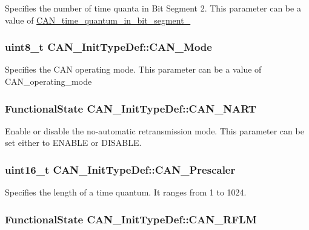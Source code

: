 \label{structCAN__InitTypeDef_a693eb00830d6e2aeb4d9fabdba85b9cf}
Specifies the number of time quanta in Bit Segment 2. This parameter can be a value of \hyperlink{group__CAN__time__quantum__in__bit__segment__2}{CAN\_\-time\_\-quantum\_\-in\_\-bit\_\-segment\_} \hypertarget{structCAN__InitTypeDef_a24816ff18ae048a5ec4bbb22aa2c04f9}{
\subsubsection[{CAN\_\-Mode}]{\setlength{\rightskip}{0pt plus 5cm}uint8\_\-t {\bf CAN\_\-InitTypeDef::CAN\_\-Mode}}}
\label{structCAN__InitTypeDef_a24816ff18ae048a5ec4bbb22aa2c04f9}
Specifies the CAN operating mode. This parameter can be a value of CAN\_\-operating\_\-mode \hypertarget{structCAN__InitTypeDef_a5adeac1b7b47f2b91e667eddc181ac09}{
\subsubsection[{CAN\_\-NART}]{\setlength{\rightskip}{0pt plus 5cm}FunctionalState {\bf CAN\_\-InitTypeDef::CAN\_\-NART}}}
\label{structCAN__InitTypeDef_a5adeac1b7b47f2b91e667eddc181ac09}
Enable or disable the no-\/automatic retransmission mode. This parameter can be set either to ENABLE or DISABLE. \hypertarget{structCAN__InitTypeDef_a3e91dbcbf30b893a9bd6a65606cb8fe9}{
\subsubsection[{CAN\_\-Prescaler}]{\setlength{\rightskip}{0pt plus 5cm}uint16\_\-t {\bf CAN\_\-InitTypeDef::CAN\_\-Prescaler}}}
\label{structCAN__InitTypeDef_a3e91dbcbf30b893a9bd6a65606cb8fe9}
Specifies the length of a time quantum. It ranges from 1 to 1024. \hypertarget{structCAN__InitTypeDef_aa63787683c0ad533b513fb60355d76f1}{
\subsubsection[{CAN\_\-RFLM}]{\setlength{\rightskip}{0pt plus 5cm}FunctionalState {\bf CAN\_\-InitTypeDef::CAN\_\-RFLM}}}
